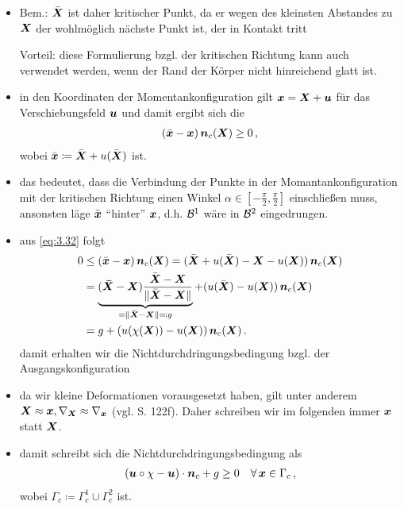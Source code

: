 \begin{itemize}
\item Bem.: $\bar{\boldsymbol X}$ ist daher kritischer Punkt, da er wegen des kleinsten Abstandes zu $\boldsymbol X$ der wohlmöglich nächste Punkt ist, der in Kontakt tritt

\item[Vorteil:] diese Formulierung bzgl. der kritischen Richtung kann auch verwendet werden, wenn der Rand der Körper nicht hinreichend glatt ist.

\item in den Koordinaten der Momentankonfiguration gilt $\boldsymbol x = \boldsymbol X + \boldsymbol u$ für das Verschiebungsfeld $\boldsymbol u$ und damit ergibt sich die \textit{}
\begin{align}\label{eq:3.32}
	(\bar{\boldsymbol x} - \boldsymbol x) \, \boldsymbol n_c (\boldsymbol X) \ge 0 \, , 
\end{align}
wobei $\bar{\boldsymbol x} \coloneqq \bar{\boldsymbol X} + u(\bar{\boldsymbol X})$ ist.

\item das bedeutet, dass die Verbindung der Punkte in der Momantankonfiguration mit der kritischen Richtung einen Winkel $\alpha \in [-\frac \pi2,\frac \pi2]$ einschließen muss, ansonsten läge $\bar{\boldsymbol x}$ "`hinter"' $\boldsymbol x$, d.h. $\mathcal B^1$ wäre in $\mathcal B^2$ eingedrungen. 

\item aus \eqref{eq:3.32} folgt
\begin{align*}
	0 &  \le (\bar{\boldsymbol x} - \boldsymbol x) \, \boldsymbol n_c (\boldsymbol X) = (\bar{\boldsymbol X} + u(\bar{\boldsymbol X}) -{\boldsymbol X} - u({\boldsymbol X})) \, \boldsymbol n_c(\boldsymbol X) \\
	& = \underbrace{(\boldsymbol{\bar X} - \boldsymbol X) \frac{\bar{\boldsymbol X}-\boldsymbol X}{\lVert \bar{\boldsymbol X}-\boldsymbol X\rVert}}_{ = \lVert \bar{\boldsymbol X}-\boldsymbol X\rVert\eqqcolon g} + ( u(\bar{\boldsymbol X})  - u({\boldsymbol X})) \, \boldsymbol n_c(\boldsymbol X) \\
	& = g + ( u(\chi(\boldsymbol X))  - u({\boldsymbol X})) \, \boldsymbol n_c(\boldsymbol X) \, .
\end{align*}
damit erhalten wir die Nichtdurchdringungsbedingung bzgl. der Ausgangskonfiguration

\item da wir kleine Deformationen vorausgesetzt haben, gilt unter anderem $\boldsymbol X \approx \boldsymbol x,  \nabla_{\boldsymbol X} \approx \nabla_{\boldsymbol x}$ (vgl. \cite{AltKonti} S. 122f). Daher schreiben wir im folgenden immer $\boldsymbol x$ statt $\boldsymbol X$.

\item damit schreibt sich die Nichtdurchdringungsbedingung als
\begin{align}\label{eq:3.33}
	(\boldsymbol u \circ \chi -\boldsymbol u) \cdot \boldsymbol n_c + g \ge 0 \quad \forall \, \boldsymbol x \in \Gamma_c \, ,
\end{align}
wobei $\Gamma_c \coloneqq \Gamma_c^1 \cup \Gamma_c^2$ ist.
	

\end{itemize}
